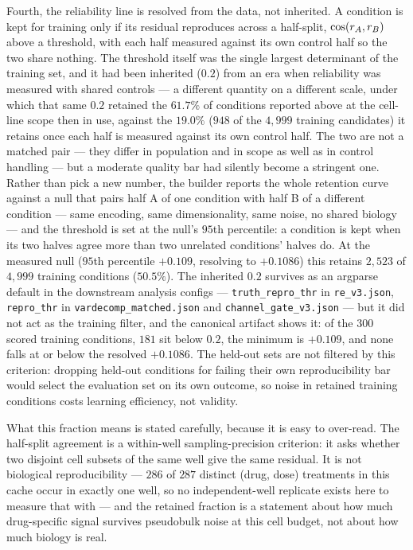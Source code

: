 Fourth, the reliability line is resolved from the data, not inherited. A condition is kept for
training only if its residual reproduces across a half-split, $\cos(r_A, r_B)$ above a
threshold, with each half measured against its own control half so the two share nothing. The
threshold itself was the single largest determinant of the training set, and it had been inherited
($0.2$) from an era when reliability was measured with shared controls --- a different quantity on a
different scale, under which that same $0.2$ retained the $61.7\%$ of conditions reported above at
the cell-line scope then in use, against the $19.0\%$ ($948$ of the $4{,}999$ training candidates) it
retains once each half is measured against its own control half. The two are not a matched pair ---
they differ in population and in scope as well as in control handling --- but a moderate quality bar
had silently become a stringent one. Rather than pick a
new number, the builder reports the whole retention curve against a null that pairs half A of one
condition with half B of a different condition --- same encoding, same dimensionality, same noise,
no shared biology --- and the threshold is set at the null's $95$th percentile: a condition is kept
when its two halves agree more than two unrelated conditions' halves do. At the measured null
($95$th percentile $+0.109$, resolving to $+0.1086$) this retains $2{,}523$ of $4{,}999$ training
conditions ($50.5\%$). The inherited $0.2$ survives as an argparse default in the downstream
analysis configs --- \texttt{truth\_repro\_thr} in \texttt{re\_v3.json}, \texttt{repro\_thr} in
\texttt{vardecomp\_matched.json} and \texttt{channel\_gate\_v3.json} --- but it did not act as the
training filter, and the canonical artifact shows it: of the $300$ scored training conditions, $181$
sit below $0.2$, the minimum is $+0.109$, and none falls at or below the resolved $+0.1086$. The
held-out sets are not filtered by this criterion: dropping held-out conditions for failing their own
reproducibility bar would select the evaluation set on its own outcome, so noise in retained
training conditions costs learning efficiency, not validity.

What this fraction means is stated carefully, because it is easy to over-read. The half-split
agreement is a within-well sampling-precision criterion: it asks whether two disjoint cell subsets
of the same well give the same residual. It is not biological reproducibility --- $286$ of $287$
distinct (drug, dose) treatments in this cache occur in exactly one well, so no independent-well
replicate exists here to measure that with --- and the retained fraction is a statement about how much
drug-specific signal survives pseudobulk noise at this cell budget, not about how much biology is
real.

